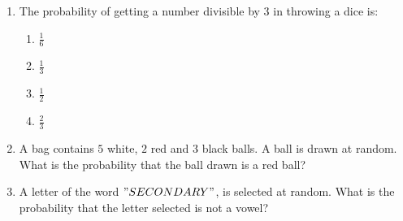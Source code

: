  \begin{enumerate}
         \item The probability of getting a number divisible by $3$ in throwing a dice is:
		 \begin{enumerate}
		 \item $\frac{1}{6}$
		 \item $\frac{1}{3}$
		 \item $\frac{1}{2}$
		 \item $\frac{2}{3}$
		 \end{enumerate}
	 \item A bag contains $5$ white, $2$ red and $3$ black balls. A ball is drawn at random. What is the probability that the ball drawn is a red ball?
	 \item A letter of the word $"SECONDARY"$, is selected at random. What is the probability that the letter selected is not a vowel?
 \end{enumerate}
